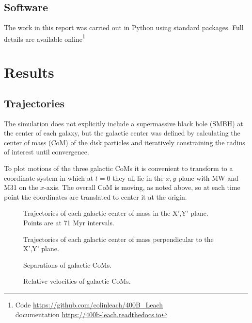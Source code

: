 \documentclass[twocolumn]{aastex63}
\begin{document}
\subsection{Software}

The work in this report was carried out in Python using standard packages. Full details are available online\footnote{Code \url{https://github.com/colinleach/400B_Leach}\\documentation \url{https://400b-leach.readthedocs.io}}

\section{Results}

\subsection{Trajectories}

The simulation does not explicitly include a supermassive black hole (SMBH) at the center of each galaxy, but the galactic center was defined by calculating the center of mass (CoM) of the disk particles and iteratively constraining the radius of interest until convergence.

To plot motions of the three galactic CoMs it is convenient to transform to a coordinate system in which at $t=0$ they all lie in the $x,y$ plane with MW and M31 on the $x$-axis. The overall CoM is moving, as noted above, so at each time point the coordinates are translated to center it at the origin.

\begin{figure}[htb!]
	\caption{Trajectories of each galactic center of mass in the X',Y' plane. Points are at 71 Myr intervals.
		\label{fig:traj_xy}}
\end{figure}

\begin{figure}[htb!]
	\caption{Trajectories of each galactic center of mass perpendicular to the X',Y' plane.
		\label{fig:traj_z}}
\end{figure}

\begin{figure}[hbt!]
	\caption{Separations of galactic CoMs.
		\label{fig:rel_sep}}
\end{figure}

\begin{figure}[hbt!]
	\caption{Relative velocities of galactic CoMs.
		\label{fig:rel_vel}}
\end{figure}
\end{document}
